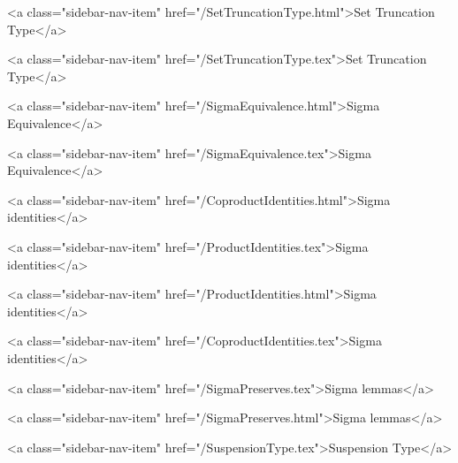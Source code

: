       
        
          <a class="sidebar-nav-item" href="/SetTruncationType.html">Set Truncation Type</a>
        
      
    
      
        
          <a class="sidebar-nav-item" href="/SetTruncationType.tex">Set Truncation Type</a>
        
      
    
      
        
          <a class="sidebar-nav-item" href="/SigmaEquivalence.html">Sigma Equivalence</a>
        
      
    
      
        
          <a class="sidebar-nav-item" href="/SigmaEquivalence.tex">Sigma Equivalence</a>
        
      
    
      
        
          <a class="sidebar-nav-item" href="/CoproductIdentities.html">Sigma identities</a>
        
      
    
      
        
          <a class="sidebar-nav-item" href="/ProductIdentities.tex">Sigma identities</a>
        
      
    
      
        
          <a class="sidebar-nav-item" href="/ProductIdentities.html">Sigma identities</a>
        
      
    
      
        
          <a class="sidebar-nav-item" href="/CoproductIdentities.tex">Sigma identities</a>
        
      
    
      
        
          <a class="sidebar-nav-item" href="/SigmaPreserves.tex">Sigma lemmas</a>
        
      
    
      
        
          <a class="sidebar-nav-item" href="/SigmaPreserves.html">Sigma lemmas</a>
        
      
    
      
        
          <a class="sidebar-nav-item" href="/SuspensionType.tex">Suspension Type</a>
        
